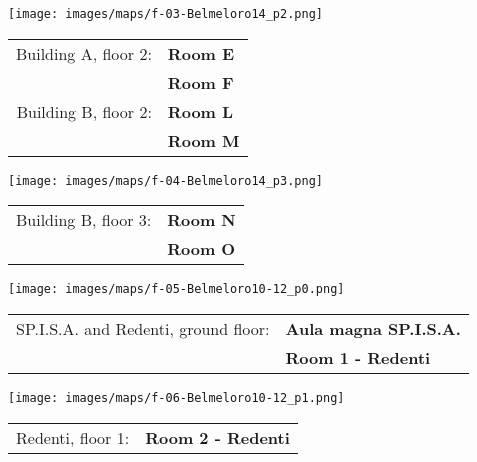 \newpage
\hspace*{-1cm}
\texttt{[image: images/maps/f-03-Belmeloro14\_p2.png]}
\vfill

\hfill
\colorbox{siamblue!50}{\large
\begin{tabular}{ r l }
  Building A, floor 2: & \textbf{Room E} \\
                       & \textbf{Room F} \\
  Building B, floor 2: & \textbf{Room L} \\
                       & \textbf{Room M}
\end{tabular}
}

\newpage
\hspace*{-1cm}
\texttt{[image: images/maps/f-04-Belmeloro14\_p3.png]}
\vfill

\hfill
\colorbox{siamblue!50}{\large
\begin{tabular}{ r l }
  Building B, floor 3: & \textbf{Room N} \\
                       & \textbf{Room O}
\end{tabular}
}

\newpage
\hspace*{-1cm}
\texttt{[image: images/maps/f-05-Belmeloro10-12\_p0.png]}

\bigskip

\hfill
\colorbox{siamblue!50}{\large
\begin{tabular}{ r l }
  SP.I.S.A. and Redenti, ground floor: & \textbf{Aula magna SP.I.S.A.} \\
                                       & \textbf{Room 1 - Redenti}
\end{tabular}
}

\vfill 

\hspace*{-1cm}
\texttt{[image: images/maps/f-06-Belmeloro10-12\_p1.png]}

\bigskip

\hfill
\colorbox{siamblue!50}{\large
\begin{tabular}{ r l }
  Redenti, floor 1: & \textbf{Room 2 - Redenti}
\end{tabular}
}



